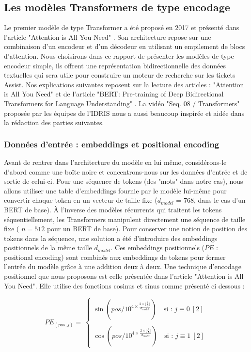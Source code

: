 \documentclass[12pt]{article}
\theoremstyle{definition}
\begin{document}
\subsection{Les modèles Transformers de type encodage}
Le premier modèle de type Transformer a été proposé en 2017 et présenté dans l’article "Attention is All You Need" \cite{a_i_a_y_n}. Son architecture repose sur une combinaison d'un encodeur et d'un décodeur en utilisant un empilement de blocs d’attention. Nous choisirons dans ce rapport de présenter les modèles de type encodeur simple, ils offrent une représentation bidirectionnelle des données textuelles qui sera utile pour construire un moteur de recherche sur les tickets Assist. Nos explications suivantes reposent sur la lecture des articles : "Attention is All You Need" \cite{a_i_a_y_n} et de l'article "BERT: Pre-training of Deep Bidirectional Transformers for
Language Understanding" \cite{bert_paper}. La vidéo "Seq. 08 / Transformers" proposée par les équipes de l'IDRIS \cite{video_trans} nous a aussi beaucoup inspirée et aidée dans la rédaction des parties suivantes.

\subsubsection{Données d'entrée : embeddings et positional encoding}

Avant de rentrer dans l'architecture du modèle en lui même, considérons-le d'abord comme une boîte noire et concentrons-nous sur les données d’entrée et de sortie de celui-ci. Pour une séquence de tokens (des "mots" dans notre cas), nous allons utiliser une table d'embeddings fournie par le modèle lui-même pour convertir chaque token en un vecteur de taille fixe ($d_{model}$ = 768, dans le cas d’un BERT de base). À l’inverse des modèles récurrents qui traitent les tokens séquentiellement, les Transformers manipulent directement une séquence de taille fixe ( $n=512$ pour un BERT de base). Pour conserver une notion de position des tokens dans la séquence, une solution a été d'introduire des embeddings positionnels de la même taille $d_{model}$. Ces embeddings positionnels ($PE$ : positional encoding) sont combinés aux embeddings de tokens pour former l'entrée du modèle grâce à une addition deux à deux. Une technique d'encodage positionnel que nous proposons est celle présentée dans l'article "Attention is All You Need". Elle utilise des fonctions cosinus et sinus comme présenté ci dessous :  

$$PE_{(pos,j)} = \ \left\{\begin{array}{c}
	\sin\left(pos/10^{4 \times \frac{2 \times\lfloor \frac{j}{2} \rfloor}{d_{model}}} \right) \quad \text{si  : } j \equiv 0 ~[2]\\\quad\\
	\cos\left(pos/10^{4 \times \frac{2 \times \lfloor \frac{j}{2} \rfloor}{d_{model}}} \right) \quad \text{si  : } j \equiv 1 ~[2]
\end{array}\right.$$
\end{document}
